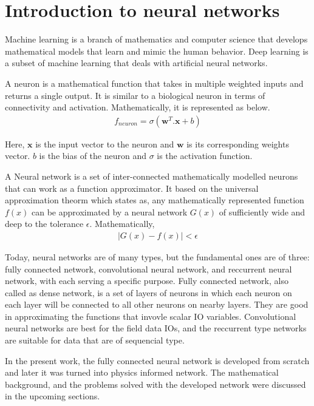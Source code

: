 \section{Introduction to neural networks}
\par{}
Machine learning is a branch of mathematics and computer science that develops
mathematical models that learn and mimic the human behavior. Deep learning
is a subset of machine learning that deals with artificial neural networks.\\
\par{}
A neuron is a mathematical function that takes in multiple weighted inputs
and returns a single output. It is similar to a biological neuron in terms
of connectivity and activation. Mathematically, it is represented as below.
\begin{align*}
	f_{neuron} = \sigma\left( \bm{w}^T.\bm{x} + b\right)
\end{align*}
\par{}
Here, \(\bm{x}\) is the input vector to the neuron and \(\bm{w}\) is its
corresponding weights vector. \(b\) is the bias of the neuron and \(\sigma\)
is the activation function.\\

\par{}
A Neural network is a set of inter-connected mathematically modelled neurons
that can work as a function approximator. It based on the
universal approximation theorm \cite{cybenko1989approximation} which states
as, any mathematically represented function \(f(x)\) can be approximated
by a neural network \(G(x)\) of sufficiently wide and deep to the tolerance \(\epsilon\).
Mathematically,
\begin{align*}
	| G(x) - f(x) | < \epsilon
\end{align*}

\par{}
Today, neural networks are of many types, but the fundamental ones are of three:
fully connected network, convolutional neural network, and reccurrent neural network,
with each serving a specific purpose. Fully connected network, also called as
dense network, is a set of layers of neurons in which each neuron on each layer
will be connected to all other neurons on nearby layers. They are good in
approximating the functions that invovle scalar IO variables. Convolutional
neural networks are best for the field data IOs, and the reccurrent type networks
are suitable for data that are of sequencial type. \\

\par{}
In the present work, the fully connected neural network is developed from
scratch and later it was turned into physics informed network. The mathematical
background, and the problems solved with the developed network were discussed
in the upcoming sections. \\
